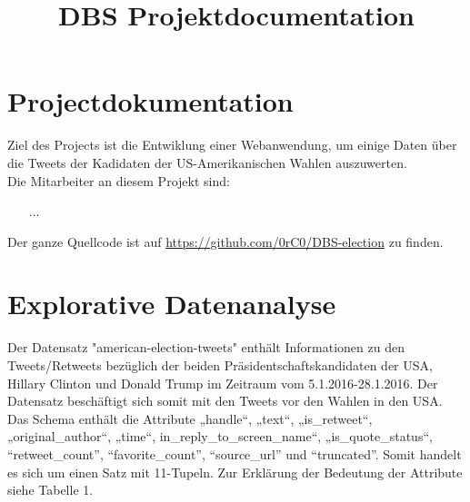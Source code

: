 \documentclass[a4paper]{article}
\title{DBS Projektdocumentation}
\author{}
\begin{document}
\maketitle


\section{Projectdokumentation}

Ziel des Projects ist die Entwiklung einer Webanwendung, um einige Daten über die Tweets der Kadidaten der US-Amerikanischen Wahlen auszuwerten. \\
Die Mitarbeiter an diesem Projekt sind:
\begin{itemize}
\item [...]
\end{itemize}
Der ganze Quellcode ist auf \href{https://github.com/0rC0/DBS-election}{https://github.com/0rC0/DBS-election} zu finden. 

\section{Explorative Datenanalyse}

Der Datensatz "american-election-tweets" enthält Informationen zu den Tweets/Retweets bezüglich der beiden Präsidentschaftskandidaten der USA, Hillary Clinton und Donald Trump im Zeitraum vom 5.1.2016-28.1.2016.
Der Datensatz beschäftigt sich somit mit den Tweets vor den Wahlen in den USA. Das Schema enthält die Attribute „handle“, „text“, „is\_retweet“, „original\_author“, „time“, in\_reply\_to\_screen\_name“, „is\_quote\_status“, “retweet\_count”, “favorite\_count”, “source\_url” und “truncated”. Somit handelt es sich um einen Satz mit 11-Tupeln. Zur Erklärung der Bedeutung der Attribute siehe Tabelle 1.
\end{document}
